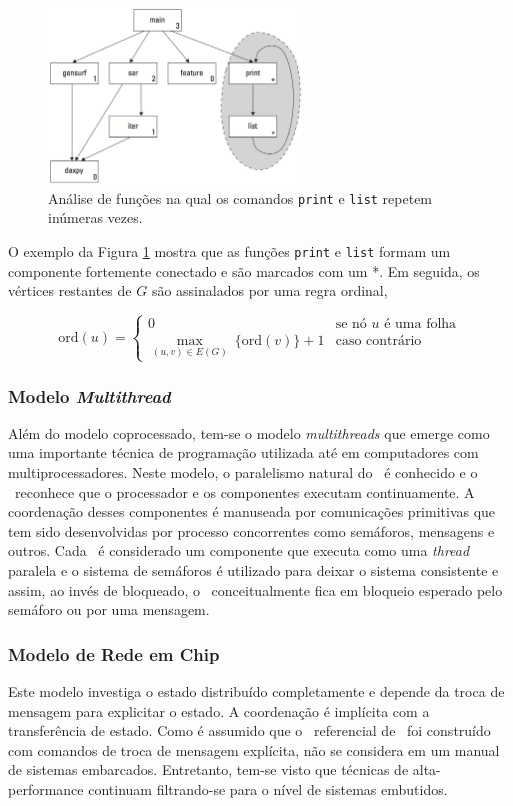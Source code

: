 			\begin{figure}[b] \centering
				\includegraphics[width=0.6\textwidth]{img/f4-4.png}
				\caption{Análise de funções na qual os comandos \texttt{print} e \texttt{list} repetem inúmeras vezes.}
				\label{fig:perf_print_list}
			\end{figure}

			O exemplo da Figura \ref{fig:perf_print_list} mostra que as funções \texttt{print} e \texttt{list} formam um componente fortemente conectado e são marcados com um *. Em seguida, os vértices restantes de $ G $ são assinalados por uma regra ordinal,

			$$
			\text{ord}(u) =
			\left\{\begin{matrix}
			0 & \text{se nó } u \text{ é uma folha} \\
			\underset{(u,v) \in E(G)}{\max}\ \{ \text{ord}(v) \} + 1 & \text{caso contrário}
			\end{matrix}\right.
			$$


	\subsubsection{Modelo \textit{Multithread}}
		Além do modelo coprocessado, tem-se o modelo \textit{multithreads} que emerge como uma importante técnica de programação utilizada até em computadores com multiprocessadores. Neste modelo, o paralelismo natural do \hardware\ é conhecido e o \designer\ reconhece que o processador e os componentes executam continuamente. A coordenação desses componentes é manuseada por comunicações primitivas que tem sido desenvolvidas por processo concorrentes como semáforos, mensagens e outros. Cada \hardware\ é considerado um componente que executa como uma \textit{thread} paralela e o sistema de semáforos é utilizado para deixar o sistema consistente e assim, ao invés de bloqueado, o \hardware\ conceitualmente fica em bloqueio esperado pelo semáforo ou por uma mensagem.


	\subsubsection{Modelo de Rede em Chip}
		Este modelo investiga o estado distribuído completamente e depende da troca de mensagem para explicitar o estado. A coordenação é implícita com a transferência de estado. Como é assumido que o \design\ referencial de \software\ foi construído com comandos de troca de mensagem explícita, não se considera em um manual de sistemas embarcados. Entretanto, tem-se visto que técnicas de alta-performance continuam filtrando-se para o nível de sistemas embutidos.


